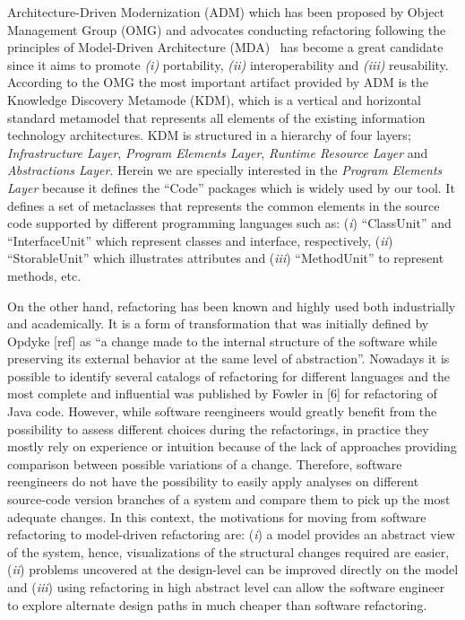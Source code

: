 Architecture-Driven Modernization (ADM) which has been proposed by Object Management Group (OMG) and advocates conducting refactoring following the principles of Model-Driven Architecture (MDA)~\cite{Ulrich:2010:IST:1841736} has become a great candidate since it aims to promote \textit{(i)} portability, \textit{(ii)} interoperability and \textit{(iii)} reusability. According to the OMG the most important artifact provided by ADM is the Knowledge Discovery Metamode (KDM), which is a vertical and horizontal standard metamodel that represents all elements of the existing information  technology architectures. KDM is structured in a hierarchy of four layers; \textit{Infrastructure Layer}, \textit{Program Elements Layer}, \textit{ Runtime Resource Layer} and \textit{Abstractions Layer}. Herein we are specially interested in the \textit{Program Elements Layer} because it defines the ``Code'' packages which is widely used by our tool. It defines a set of metaclasses that represents the common elements in the source code supported by different programming languages such as: (\textit{i}) ``ClassUnit'' and ``InterfaceUnit'' which represent classes and interface, respectively, (\textit{ii}) ``StorableUnit'' which illustrates attributes and (\textit{iii}) ``MethodUnit'' to represent methods, etc.

On the other hand, refactoring has been known and highly used both industrially and academically. It is a form of transformation that was initially defined by Opdyke [ref] as ``a change made to the internal structure of the software while preserving its external behavior at the same level of abstraction''. Nowadays it is possible to identify several catalogs of refactoring for different languages and the most complete and influential was published by Fowler in [6] for refactoring of Java code. 
However, while software reengineers would greatly benefit from the possibility to assess different choices during the refactorings, in practice they mostly rely on experience or intuition because of the lack of approaches providing comparison between possible variations of a change. 
Therefore, software reengineers do not have the possibility to easily apply analyses on different source-code version branches of a system and compare them to pick up the most adequate changes. In this context, the motivations for moving from software refactoring  to model-driven refactoring are: 
(\textit{i}) a model provides an abstract view of the system, hence, visualizations of the structural changes required are easier, 
(\textit{ii}) problems uncovered at the design-level can be improved directly on the model and 
(\textit{iii}) using refactoring in high abstract level can allow the software engineer to explore alternate design paths in much cheaper than software refactoring.


